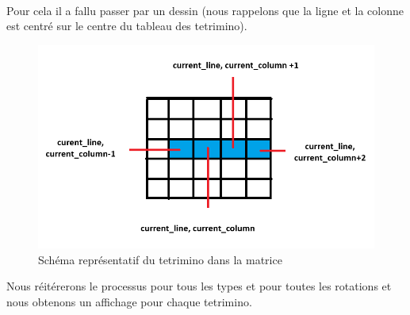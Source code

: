 \documentclass[a4paper,10p]{report}
\begin{document}
\\Pour cela il a fallu passer par un dessin (nous rappelons que la ligne et la colonne est centré sur le centre du tableau des tetrimino).
\begin{figure}[ht]
\includegraphics[scale=0.5]{tetrimino_dessin.png}
\caption{\label{dessin7} Schéma représentatif du tetrimino dans la matrice}
\end{figure}
\newpage
Nous réitérerons le processus pour tous les types et pour toutes les rotations et nous obtenons un affichage pour chaque tetrimino. 
\end{document}
